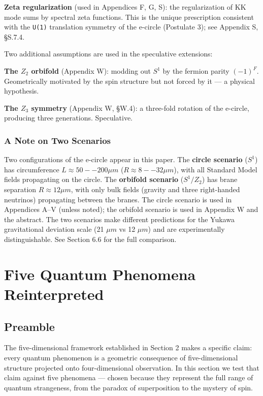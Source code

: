 \documentclass[aps,prd,preprint,superscriptaddress,longbibliography,floatfix]{revtex4-2}
\theoremstyle{remark}
\begin{document}
\textbf{Zeta regularization} (used in Appendices F, G, S): the regularization of KK mode sums by spectral zeta functions. This is the unique prescription consistent with the \texttt{U(1)} translation symmetry of the e-circle (Postulate 3); see Appendix S, \S{}S.7.4.

Two additional assumptions are used in the speculative extensions:

\textbf{The $Z_{2}$ orbifold} (Appendix W): modding out $S^{1}$ by the fermion parity $(-1)^F$. Geometrically motivated by the spin structure but not forced by it --- a physical hypothesis.

\textbf{The $Z_{3}$ symmetry} (Appendix W, \S{}W.4): a three-fold rotation of the e-circle, producing three generations. Speculative.


\subsubsection{A Note on Two Scenarios}

Two configurations of the e-circle appear in this paper. The \textbf{circle scenario} ($S^{1}$) has circumference $L \approx 50--200 \mu m$ ($R \approx 8--32 \mu m$), with all Standard Model fields propagating on the circle. The \textbf{orbifold scenario} ($S^{1}/Z_{2}$) has brane separation $R \approx 12 \mu m$, with only bulk fields (gravity and three right-handed neutrinos) propagating between the branes. The circle scenario is used in Appendices A--V (unless noted); the orbifold scenario is used in Appendix W and the abstract. The two scenarios make different predictions for the Yukawa gravitational deviation scale (21 $\mu m$ vs 12 $\mu m$) and are experimentally distinguishable. See Section 6.6 for the full comparison.



\section{Five Quantum Phenomena Reinterpreted}



\subsection{Preamble}

The five-dimensional framework established in Section 2 makes a specific claim: every quantum phenomenon is a geometric consequence of five-dimensional structure projected onto four-dimensional observation. In this section we test that claim against five phenomena --- chosen because they represent the full range of quantum strangeness, from the paradox of superposition to the mystery of spin.
\end{document}
